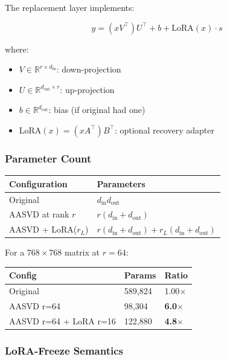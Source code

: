 The replacement layer implements:

\[
y = (x V^\top) U^\top + b + \text{LoRA}(x) \cdot s
\tag{4.16}
\]

where:

\begin{itemize}
\item $V \in \mathbb{R}^{r \times d_\text{in}}$: down-projection
\item $U \in \mathbb{R}^{d_\text{out} \times r}$: up-projection
\item $b \in \mathbb{R}^{d_\text{out}}$: bias (if original had one)
\item $\text{LoRA}(x) = (x A^\top) B^\top$: optional recovery adapter

\end{itemize}
\subsubsection{Parameter Count}

\begin{table}[H]
\centering
\small
\begin{tabular}{ll}
\toprule
\textbf{Configuration} & \textbf{Parameters} \\
\midrule
Original & $d_\text{in} d_\text{out}$ \\
AASVD at rank $r$ & $r(d_\text{in} + d_\text{out})$ \\
AASVD + LoRA($r_L$) & $r(d_\text{in} + d_\text{out}) + r_L(d_\text{in} + d_\text{out})$ \\
\bottomrule
\end{tabular}
\end{table}

For a $768 \times 768$ matrix at $r = 64$:

\begin{table}[H]
\centering
\small
\begin{tabular}{lll}
\toprule
\textbf{Config} & \textbf{Params} & \textbf{Ratio} \\
\midrule
Original & 589,824 & 1.00$\times$ \\
AASVD r=64 & 98,304 & \textbf{6.0$\times$} \\
AASVD r=64 + LoRA r=16 & 122,880 & \textbf{4.8$\times$} \\
\bottomrule
\end{tabular}
\end{table}

\subsubsection{LoRA-Freeze Semantics}


